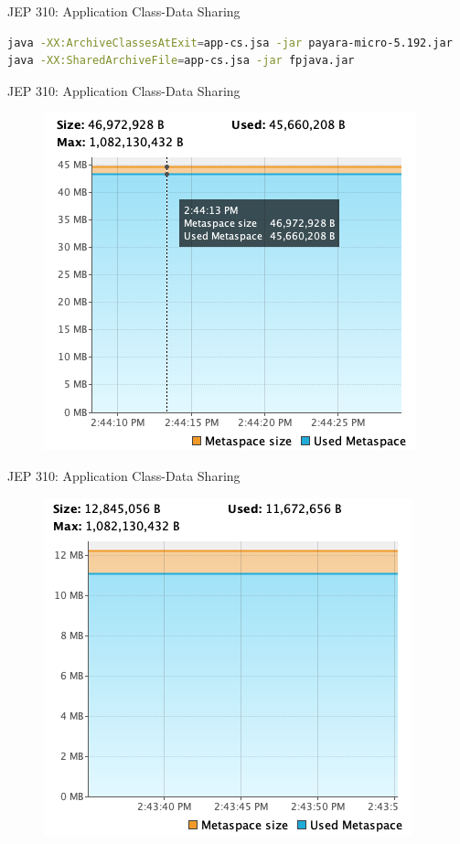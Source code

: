 \documentclass[aspectratio=169]{beamer}
\begin{document}
\begin{frame}[fragile]{JEP 310: Application Class-Data Sharing}
\begin{lstlisting}[language=bash,basicstyle=\scriptsize]
java -XX:ArchiveClassesAtExit=app-cs.jsa -jar payara-micro-5.192.jar
java -XX:SharedArchiveFile=app-cs.jsa -jar fpjava.jar
\end{lstlisting}	
\end{frame}
\begin{frame}[fragile]{JEP 310: Application Class-Data Sharing}
    \begin{figure}
        \centering
        \includegraphics[width=0.7\linewidth]{Images/nocdsmem}
    \end{figure}
\end{frame}
\begin{frame}[fragile]{JEP 310: Application Class-Data Sharing}
    \begin{figure}
        \centering
        \includegraphics[width=0.7\linewidth]{Images/cdsmem}
    \end{figure}
\end{frame}
\end{document}
